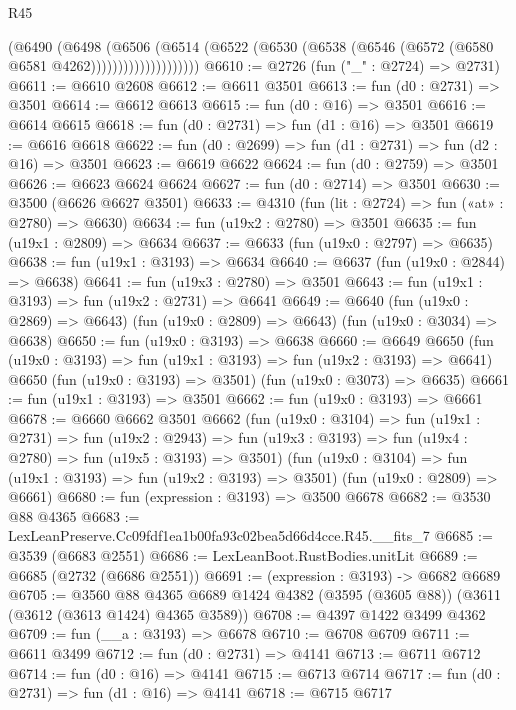 \begin{lexlean}{R45}
\begin{coremodule}
                        (@6490
                          (@6498
                            (@6506
                              (@6514
                                (@6522
                                  (@6530 (@6538 (@6546 (@6572 (@6580 @6581 @4262))))))))))))))))))))
@6610 := @2726 (fun ("_" : @2724) => @2731)
@6611 := @6610 @2608
@6612 := @6611 @3501
@6613 := fun (d0 : @2731) => @3501
@6614 := @6612 @6613
@6615 := fun (d0 : @16) => @3501
@6616 := @6614 @6615
@6618 := fun (d0 : @2731) => fun (d1 : @16) => @3501
@6619 := @6616 @6618
@6622 := fun (d0 : @2699) => fun (d1 : @2731) => fun (d2 : @16) => @3501
@6623 := @6619 @6622
@6624 := fun (d0 : @2759) => @3501
@6626 := @6623 @6624 @6624
@6627 := fun (d0 : @2714) => @3501
@6630 := @3500 (@6626 @6627 @3501)
@6633 := @4310 (fun (lit : @2724) => fun («at» : @2780) => @6630)
@6634 := fun (u19x2 : @2780) => @3501
@6635 := fun (u19x1 : @2809) => @6634
@6637 := @6633 (fun (u19x0 : @2797) => @6635)
@6638 := fun (u19x1 : @3193) => @6634
@6640 := @6637 (fun (u19x0 : @2844) => @6638)
@6641 := fun (u19x3 : @2780) => @3501
@6643 := fun (u19x1 : @3193) => fun (u19x2 : @2731) => @6641
@6649 := @6640
    (fun (u19x0 : @2869) => @6643)
    (fun (u19x0 : @2809) => @6643)
    (fun (u19x0 : @3034) => @6638)
@6650 := fun (u19x0 : @3193) => @6638
@6660 := @6649
    @6650
    (fun (u19x0 : @3193) => fun (u19x1 : @3193) => fun (u19x2 : @3193) => @6641)
    @6650
    (fun (u19x0 : @3193) => @3501)
    (fun (u19x0 : @3073) => @6635)
@6661 := fun (u19x1 : @3193) => @3501
@6662 := fun (u19x0 : @3193) => @6661
@6678 := @6660
    @6662
    @3501
    @6662
    (fun (u19x0 : @3104) =>
    fun (u19x1 : @2731) =>
    fun (u19x2 : @2943) =>
    fun (u19x3 : @3193) => fun (u19x4 : @2780) => fun (u19x5 : @3193) => @3501)
    (fun (u19x0 : @3104) => fun (u19x1 : @3193) => fun (u19x2 : @3193) => @3501)
    (fun (u19x0 : @2809) => @6661)
@6680 := fun (expression : @3193) => @3500 @6678
@6682 := @3530 @88 @4365
@6683 := LexLeanPreserve.Cc09fdf1ea1b00fa93c02bea5d66d4cce.R45.__fits_7
@6685 := @3539 (@6683 @2551)
@6686 := LexLeanBoot.RustBodies.unitLit
@6689 := @6685 (@2732 (@6686 @2551))
@6691 := (expression : @3193) -> @6682 @6689
@6705 := @3560
    @88
    @4365
    @6689
    @1424
    @4382
    (@3595 (@3605 @88))
    (@3611 (@3612 (@3613 @1424) @4365 @3589))
@6708 := @4397 @1422 @3499 @4362
@6709 := fun (__a : @3193) => @6678
@6710 := @6708 @6709
@6711 := @6611 @3499
@6712 := fun (d0 : @2731) => @4141
@6713 := @6711 @6712
@6714 := fun (d0 : @16) => @4141
@6715 := @6713 @6714
@6717 := fun (d0 : @2731) => fun (d1 : @16) => @4141
@6718 := @6715 @6717

\end{coremodule}
\end{lexlean}
